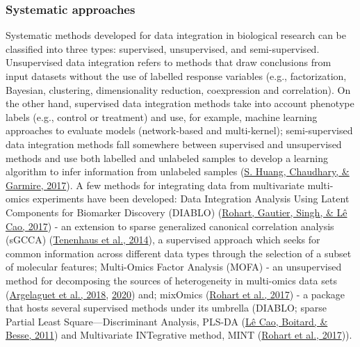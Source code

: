\documentclass[12pt,twoside]{reedthesis}
\begin{document}
\hypertarget{systematic-approaches}{%
\subsubsection*{Systematic approaches}\label{systematic-approaches}}

Systematic methods developed for data integration in biological research
can be classified into three types: supervised, unsupervised, and
semi-supervised. Unsupervised data integration refers to methods that
draw conclusions from input datasets without the use of labelled
response variables (e.g., factorization, Bayesian, clustering,
dimensionality reduction, coexpression and correlation). On the other
hand, supervised data integration methods take into account phenotype
labels (e.g., control or treatment) and use, for example, machine
learning approaches to evaluate models (network-based and multi-kernel);
semi-supervised data integration methods fall somewhere between
supervised and unsupervised methods and use both labelled and unlabeled
samples to develop a learning algorithm to infer information from
unlabeled samples (\protect\hyperlink{ref-huang2017}{S. Huang, Chaudhary, \& Garmire, 2017}). A few methods for integrating data from
multivariate multi-omics experiments have been developed: Data
Integration Analysis Using Latent Components for Biomarker Discovery
(DIABLO) (\protect\hyperlink{ref-rohart2017}{Rohart, Gautier, Singh, \& Lê Cao, 2017}) - an extension to sparse generalized canonical
correlation analysis (sGCCA) (\protect\hyperlink{ref-tenenhaus2014}{Tenenhaus et al., 2014}), a supervised approach
which seeks for common information across different data types through
the selection of a subset of molecular features; Multi-Omics Factor
Analysis (MOFA) - an unsupervised method for decomposing the sources of
heterogeneity in multi-omics data sets (\protect\hyperlink{ref-argelaguet2018}{Argelaguet et al., 2018}, \protect\hyperlink{ref-argelaguet2020}{2020}) and; mixOmics (\protect\hyperlink{ref-rohart2017}{Rohart et al., 2017}) - a package that hosts
several supervised methods under its umbrella (DIABLO; sparse Partial
Least Square---Discriminant Analysis, PLS-DA (\protect\hyperlink{ref-luxeacao2011}{Lê Cao, Boitard, \& Besse, 2011}) and
Multivariate INTegrative method, MINT (\protect\hyperlink{ref-rohart2017}{Rohart et al., 2017})).
\end{document}
